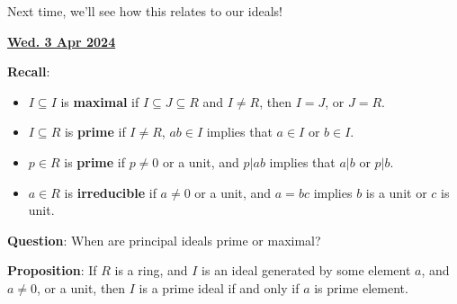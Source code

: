 \documentclass[12pt]{article}
\renewcommand{\date}[1]{\underline{\bf #1}}
\theoremstyle{remark}
\theoremstyle{remark}
\theoremstyle{remark}
\theoremstyle{remark}
\theoremstyle{remark}
\begin{document}

Next time, we'll see how this relates to our ideals!

\date{Wed. 3 Apr 2024}


{\bf Recall}: 

\begin{itemize}
  \item $I \subseteq I$ is {\bf maximal} if $I \subseteq J \subseteq R$ and $I \ne R$, then $I = J$, or $J = R$.
  \item $I \subseteq R$ is {\bf prime} if $I \ne R$, $ab \in I$ implies that $a
    \in I$ or $b \in I$.
  \item $p \in R$ is {\bf prime} if $p \ne 0$ or a unit, and $p | ab$ implies
    that $a | b$ or $p | b$.
  \item $a \in R$ is {\bf irreducible} if $a \ne 0$ or a unit, and $a = bc$
    implies $b$ is a unit or $c$ is unit.
\end{itemize}

{\bf Question}: When are principal ideals prime or maximal?

{\bf Proposition}: If $R$ is a ring, and $I$ is an ideal generated by some
element $a$, and $a \ne 0$, or a unit, then $I$ is a prime ideal if and only if
$a$ is prime element.
\end{document}
